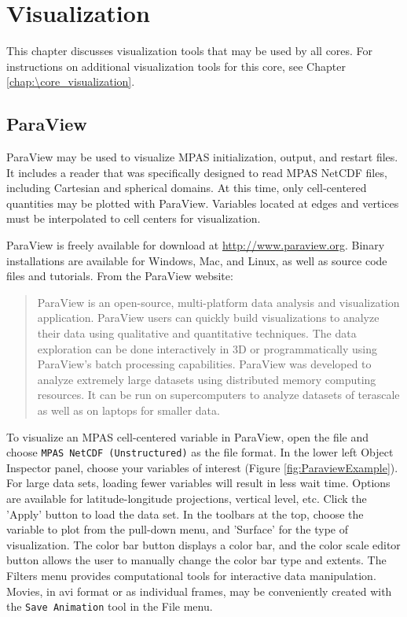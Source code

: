 
\chapter{Visualization}
\label{chap:mpas_visualization}

This chapter discusses visualization tools that may be used by all cores.  For instructions on additional visualization tools for this core, see Chapter \ref{chap:\core_visualization}.

\section{ParaView}

ParaView may be used to visualize MPAS initialization, output, and restart files.  It includes a reader that was specifically designed to read MPAS NetCDF files, including Cartesian and spherical domains.  At this time, only cell-centered quantities may be plotted with ParaView.  Variables located at edges and vertices must be interpolated to cell centers for visualization.

ParaView is freely available for download at \url{http://www.paraview.org}.  Binary installations are available for Windows, Mac, and Linux, as well as source code files and tutorials.  From the ParaView website:
\begin{quotation}
ParaView is an open-source, multi-platform data analysis and visualization application. ParaView users can quickly build visualizations to analyze their data using qualitative and quantitative techniques. The data exploration can be done interactively in 3D or programmatically using ParaView's batch processing capabilities.  ParaView was developed to analyze extremely large datasets using distributed memory computing resources. It can be run on supercomputers to analyze datasets of terascale as well as on laptops for smaller data.
\end{quotation}

To visualize an MPAS cell-centered variable in ParaView, open the file and choose {\tt MPAS NetCDF (Unstructured)} as the file format.  In the lower left Object Inspector panel, choose your variables of interest (Figure \ref{fig:ParaviewExample}).  For large data sets, loading fewer variables will result in less wait time.  Options are available for latitude-longitude projections, vertical level, etc.  Click the 'Apply' button to load the data set.  In the toolbars at the top, choose the variable to plot from the pull-down menu, and 'Surface' for the type of visualization.  The color bar button displays a color bar, and the color scale editor button allows the user to manually change the color bar type and extents.  The Filters menu provides computational tools for interactive data manipulation.  Movies, in avi format or as individual frames, may be conveniently created with the {\tt Save Animation} tool in the File menu.


